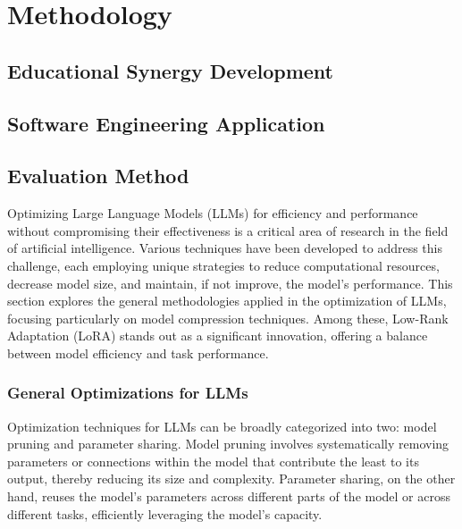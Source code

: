 
\chapter{Methodology}

\section{Educational Synergy Development}

\section{Software Engineering Application}

\section{Evaluation Method}
    Optimizing Large Language Models (LLMs) for efficiency and performance without compromising their effectiveness is a critical area of research in the field of artificial intelligence. Various techniques have been developed to address this challenge, each employing unique strategies to reduce computational resources, decrease model size, and maintain, if not improve, the model's performance. This section explores the general methodologies applied in the optimization of LLMs, focusing particularly on model compression techniques. Among these, Low-Rank Adaptation (LoRA) stands out as a significant innovation, offering a balance between model efficiency and task performance.

    \subsection{General Optimizations for LLMs}
        Optimization techniques for LLMs can be broadly categorized into two: model pruning and parameter sharing. Model pruning involves systematically removing parameters or connections within the model that contribute the least to its output, thereby reducing its size and complexity. Parameter sharing, on the other hand, reuses the model's parameters across different parts of the model or across different tasks, efficiently leveraging the model's capacity.

